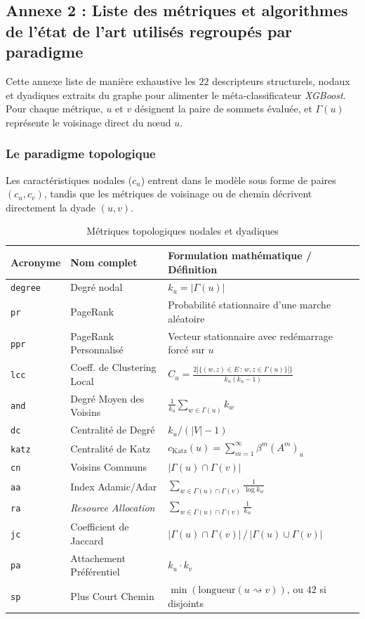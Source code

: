 \newpage

\subsection{Annexe 2 : Liste des métriques et algorithmes de l'état de l'art utilisés regroupés par paradigme}
\label{sec:Annexe2}

Cette annexe liste de manière exhaustive les $22$ descripteurs structurels, nodaux et dyadiques extraits du graphe pour alimenter le méta-classificateur \textit{XGBoost}. Pour chaque métrique, $u$ et $v$ désignent la paire de sommets évaluée, et $\Gamma(u)$ représente le voisinage direct du nœud $u$.

\subsubsection{Le paradigme topologique}

Les caractéristiques nodales ($c_u$) entrent dans le modèle sous forme de paires $(c_u, c_v)$, tandis que les métriques de voisinage ou de chemin décrivent directement la dyade $(u, v)$.

\begin{table}[h]
\centering
\caption{Métriques topologiques nodales et dyadiques}
\label{tab:metriques_topo}
\begin{tabular}{lll}
\hline
\textbf{Acronyme} & \textbf{Nom complet} & \textbf{Formulation mathématique / Définition} \\
\hline
\texttt{degree} & Degré nodal & $k_u = |\Gamma(u)|$ \\
\texttt{pr} & PageRank & Probabilité stationnaire d'une marche aléatoire \\
\texttt{ppr} & PageRank Personnalisé & Vecteur stationnaire avec redémarrage forcé sur $u$ \\
\texttt{lcc} & Coeff. de Clustering Local & $C_u = \frac{2 |\{ (w,z) \in E \,:\, w,z \in \Gamma(u) \}|\} }{k_u(k_u-1)}$ \\
\texttt{and} & Degré Moyen des Voisins & $\frac{1}{k_u} \sum_{w \in \Gamma(u)} k_w$ \\
\texttt{dc} & Centralité de Degré & $k_u / (|V|-1)$ \\
\texttt{katz} & Centralité de Katz & $c_{\text{Katz}}(u) = \sum_{m=1}^{\infty} \beta^m (A^m)_{u}$ \\
\texttt{cn} & Voisins Communs & $|\Gamma(u) \cap \Gamma(v)|$ \\
\texttt{aa} & Index Adamic/Adar & $\sum_{w \in \Gamma(u) \cap \Gamma(v)} \frac{1}{\log k_w}$ \\
\texttt{ra} & \textit{Resource Allocation} & $\sum_{w \in \Gamma(u) \cap \Gamma(v)} \frac{1}{k_w}$ \\
\texttt{jc} & Coefficient de Jaccard & $|\Gamma(u) \cap \Gamma(v)| \,/\, |\Gamma(u) \cup \Gamma(v)|$ \\
\texttt{pa} & Attachement Préférentiel & $k_u \cdot k_v$ \\
\texttt{sp} & Plus Court Chemin & $\min(\text{longueur}(u \rightsquigarrow v))$, ou $42$ si disjoints \\
\hline
\end{tabular}
\end{table}

